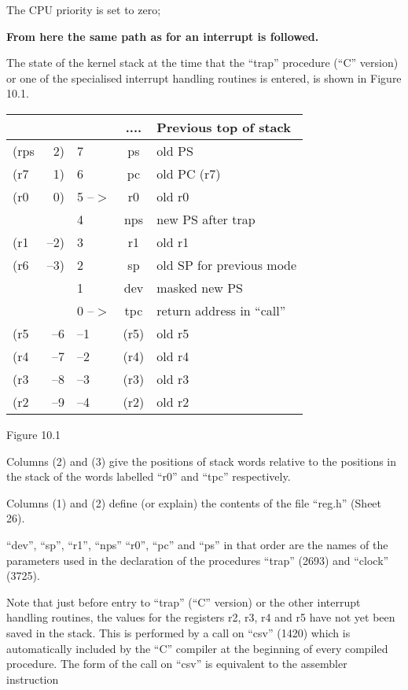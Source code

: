 \item[0773:] The CPU priority is set to zero;

{\bf From here the same path as for an
interrupt is followed.}
\ed



The state of the kernel stack at the
time that the ``trap'' procedure (``C''
version) or one of the specialised
interrupt handling routines is entered,
is shown in Figure 10.1.

\begin{center}
\begin{tabular}{lrl|c|l}
 & & & .... & {\bf Previous top of stack} \\ \hline
(rps & 2)  & 7      & ps   & old PS \\
(r7  & 1)  & 6      & pc   & old PC (r7) \\
(r0  & 0)  & 5 --$>$ & r0   & old r0 \\
     &     & 4      & nps  & new PS after trap \\
(r1  & --2) & 3      & r1   & old r1 \\
(r6  & --3) & 2      & sp   & old SP for previous mode \\
     &     & 1      & dev  & masked new PS \\
     &     & 0 --$>$ & tpc  & return address in ``call'' \\ \hline
(r5  & --6  & --1     & (r5) & old r5 \\
(r4  & --7  & --2     & (r4) & old r4 \\
(r3  & --8  & --3     & (r3) & old r3 \\
(r2  & --9  & --4     & (r2) & old r2 \\
\end{tabular}
\bigskip

Figure 10.1
\end{center}

Columns (2) and (3) give the positions
of stack words relative to the positions in the stack of the words
labelled ``r0'' and ``tpc'' respectively.

Columns (1) and (2) define (or explain)
the contents of the file ``reg.h'' (Sheet 26).

``dev'', ``sp'', ``r1'', ``nps'' ``r0'', ``pc'' and
``ps'' in that order are the names of the
parameters used in the declaration of
the procedures ``trap'' (2693) and
``clock'' (3725).

Note that just before entry to ``trap''
(``C'' version) or the other interrupt
handling routines, the values for the
registers r2, r3, r4 and r5 have not
yet been saved in the stack. This is
performed by a call on ``csv'' (1420)
which is automatically included by the
``C'' compiler at the beginning of every
compiled procedure. The form of the
call on ``csv'' is equivalent to the
assembler instruction

